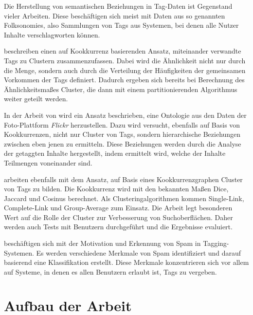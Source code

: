 Die Herstellung von semantischen Beziehungen in Tag-Daten ist Gegenstand vieler Arbeiten. Diese beschäftigen sich meist mit Daten aus so genannten Folksonomies, also Sammlungen von Tags aus Systemen, bei denen alle Nutzer Inhalte verschlagworten können.

\textcite{bks2006} beschreiben einen auf Kookkurrenz basierenden Ansatz, miteinander verwandte Tags zu Clustern zusammenzufassen. Dabei wird die Ähnlichkeit nicht nur durch die Menge, sondern auch durch die Verteilung der Häufigkeiten der gemeinsamen Vorkommen der Tags definiert. Dadurch ergeben sich bereits bei Berechnung des Ähnlichkeitsmaßes Cluster, die dann mit einem partitionierenden Algorithmus weiter geteilt werden.

In der Arbeit von \textcite{ps2006} wird ein Ansatz beschrieben, eine Ontologie aus den Daten der Foto-Plattform \emph{Flickr} herzustellen. Dazu wird versucht, ebenfalls auf Basis von Kookkurrenzen, nicht nur Cluster von Tags, sondern hierarchische Beziehungen zwischen eben jenen zu ermitteln. Diese Beziehungen werden durch die Analyse der getaggten Inhalte hergestellt, indem ermittelt wird, welche der Inhalte Teilmengen voneinander sind.

\textcite{kss2010} arbeiten ebenfalls mit dem Ansatz, auf Basis eines Kookkurrenzgraphen Cluster von Tags zu bilden. Die Kookkurrenz wird mit den bekannten Maßen Dice, Jaccard und Cosinus berechnet. Als Clusteringalgorithmen kommen Single-Link, Complete-Link und Group-Average zum Einsatz. Die Arbeit legt besonderen Wert auf die Rolle der Cluster zur Verbesserung von Suchoberflächen. Daher werden auch Tests mit Benutzern durchgeführt und die Ergebnisse evaluiert.

\textcite{mcf2009} beschäftigen sich mit der Motivation und Erkennung von Spam in Tagging-Systemen. Es werden verschiedene Merkmale von Spam identifiziert und darauf basierend eine Klassifikation erstellt. Diese Merkmale konzentrieren sich vor allem auf Systeme, in denen es allen Benutzern erlaubt ist, Tags zu vergeben.

\section{Aufbau der Arbeit}